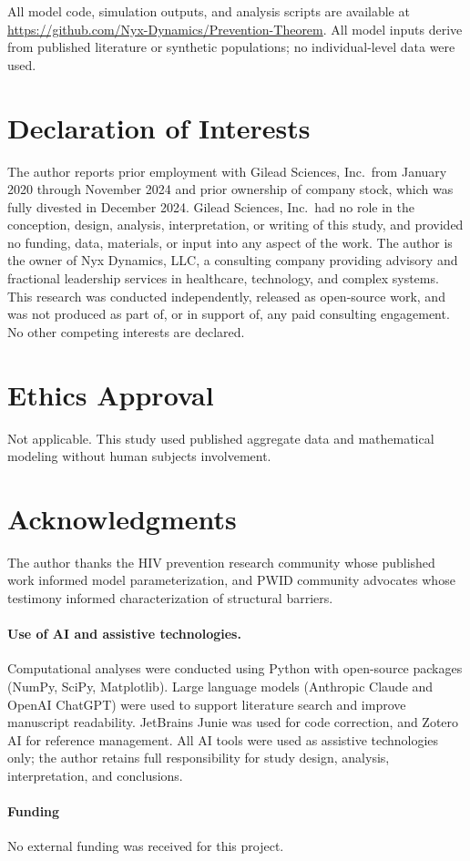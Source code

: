 \documentclass[12pt,a4paper]{article}
\theoremstyle{plain}
\theoremstyle{definition}
\theoremstyle{remark}
\begin{document}
All model code, simulation outputs, and analysis scripts are available at \url{https://github.com/Nyx-Dynamics/Prevention-Theorem}. All model inputs derive from published literature or synthetic populations; no individual-level data were used.

\section*{Declaration of Interests}

The author reports prior employment with Gilead Sciences, Inc.\ from January 2020 through November 2024 and prior ownership of company stock, which was fully divested in December 2024. Gilead Sciences, Inc.\ had no role in the conception, design, analysis, interpretation, or writing of this study, and provided no funding, data, materials, or input into any aspect of the work. The author is the owner of Nyx Dynamics, LLC, a consulting company providing advisory and fractional leadership services in healthcare, technology, and complex systems. This research was conducted independently, released as open-source work, and was not produced as part of, or in support of, any paid consulting engagement. No other competing interests are declared.

\section*{Ethics Approval}

Not applicable. This study used published aggregate data and mathematical modeling without human subjects involvement.

\section*{Acknowledgments}

The author thanks the HIV prevention research community whose published work informed model parameterization, and PWID community advocates whose testimony informed characterization of structural barriers.

\paragraph{Use of AI and assistive technologies.}
Computational analyses were conducted using Python with open-source packages (NumPy, SciPy, Matplotlib). Large language models (Anthropic Claude and OpenAI ChatGPT) were used to support literature search and improve manuscript readability. JetBrains Junie was used for code correction, and Zotero AI for reference management. All AI tools were used as assistive technologies only; the author retains full responsibility for study design, analysis, interpretation, and conclusions.

\paragraph{Funding}
No external funding was received for this project.




\end{document}
